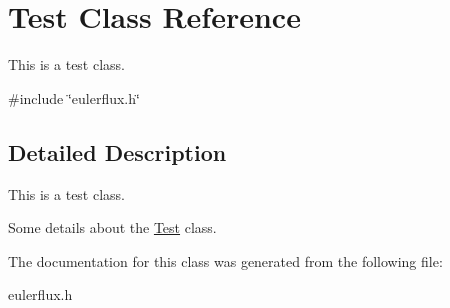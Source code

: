 \hypertarget{classTest}{}\section{Test Class Reference}
\label{classTest}


This is a test class.  




{\ttfamily \#include \char`\"{}eulerflux.\+h\char`\"{}}



\subsection{Detailed Description}
This is a test class. 

Some details about the \hyperlink{classTest}{Test} class. 

The documentation for this class was generated from the following file\+:\begin{DoxyCompactItemize}
\item 
eulerflux.\+h\end{DoxyCompactItemize}
